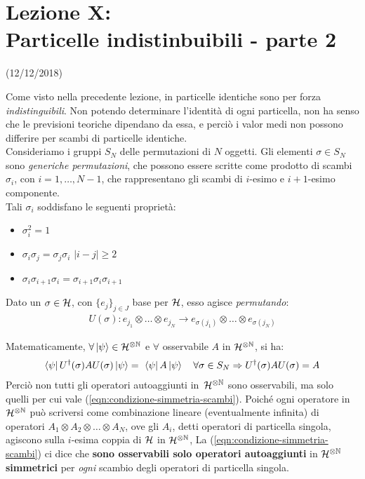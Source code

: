 \documentclass[../../FisicaTeorica.tex]{subfiles}
\begin{document}
\section{Lezione X:\\ \large{Particelle indistinbuibili - parte 2}}
\vspace{-1em}
\begin{center}
    \small{(12/12/2018)}
\end{center}

Come visto nella precedente lezione, in \MQ particelle identiche sono per forza \textit{indistinguibili}. Non potendo determinare l'identità di ogni particella, non ha senso che le previsioni teoriche dipendano da essa, e perciò i valor medi non possono differire per scambi di particelle identiche.\\
Consideriamo i gruppi $S_N$ delle permutazioni di $N$ oggetti. Gli elementi $\sigma \in S_N$ sono \textit{generiche permutazioni}, che possono essere scritte come prodotto di scambi $\sigma_i$, con $i=1, \dots, N-1$, che rappresentano gli scambi di $i$-esimo e $i+1$-esimo componente.\\
Tali $\sigma_i$ soddisfano le seguenti proprietà:
\begin{itemize}
\item $\sigma_i^2 = 1$
\item $\sigma_i \sigma_j = \sigma_j \sigma_i$ $|i-j| \geq 2$
\item $\sigma_i \sigma_{i+1} \sigma_i = \sigma_{i+1}\sigma_i \sigma_{i+1}$
\end{itemize}
Dato un $\sigma \in \mathcal{H}$, con $\{e_j\}_{j\in J}$ base per $\mathcal{H}$, esso agisce \textit{permutando}:
\begin{align*}
U(\sigma): e_{j_1} \otimes \dots \otimes e_{j_N} \to e_{\sigma(j_1)} \otimes \dots \otimes e_{\sigma(j_N)}
\end{align*}

Matematicamente, $\forall \ket{\psi}\in \mathcal{H}^{\otimes \mathbb{N}}$ e $\forall$ osservabile $A$ in $\mathcal{H}^{\otimes \mathbb{N}}$, si ha:
\begin{align}
\bra{\psi} U^\dag(\sigma)AU(\sigma)\ket{\psi} =\ \bra{\psi}A\ket{\psi}\quad \forall \sigma \in S_N \Rightarrow U^\dag(\sigma)AU(\sigma)=A
\label{eqn:condizione-simmetria-scambi}
\end{align}
Perciò non tutti gli operatori autoaggiunti in\ $\mathcal{H}^{\otimes \mathbb{N}}$ sono osservabili, ma solo quelli per cui vale (\ref{eqn:condizione-simmetria-scambi}). Poiché ogni operatore in $\mathcal{H}^{\otimes \mathbb{N}}$ può scriversi come combinazione lineare (eventualmente infinita) di operatori $A_1 \otimes A_2 \otimes \dots \otimes A_N$, ove gli $A_i$, detti operatori di particella singola, agiscono sulla $i$-esima coppia di $\mathcal{H}$ in $\mathcal{H}^{\otimes \mathbb{N}}$, La (\ref{eqn:condizione-simmetria-scambi}) ci dice che \textbf{sono osservabili solo operatori autoaggiunti} in $\mathcal{H}^{\otimes \mathbb{N}}$ \textbf{simmetrici} per \textit{ogni} scambio degli operatori di particella singola.\\
\end{document}
